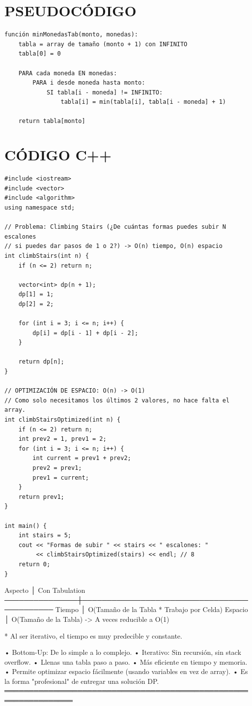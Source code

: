 \section*{PSEUDOCÓDIGO}
\hrulefill
\begin{verbatim}
función minMonedasTab(monto, monedas):
    tabla = array de tamaño (monto + 1) con INFINITO
    tabla[0] = 0

    PARA cada moneda EN monedas:
        PARA i desde moneda hasta monto:
            SI tabla[i - moneda] != INFINITO:
                tabla[i] = min(tabla[i], tabla[i - moneda] + 1)

    return tabla[monto]
\end{verbatim}
\section*{CÓDIGO C++}
\hrulefill
\begin{lstlisting}
#include <iostream>
#include <vector>
#include <algorithm>
using namespace std;

// Problema: Climbing Stairs (¿De cuántas formas puedes subir N escalones
// si puedes dar pasos de 1 o 2?) -> O(n) tiempo, O(n) espacio
int climbStairs(int n) {
    if (n <= 2) return n;
    
    vector<int> dp(n + 1);
    dp[1] = 1;
    dp[2] = 2;

    for (int i = 3; i <= n; i++) {
        dp[i] = dp[i - 1] + dp[i - 2];
    }

    return dp[n];
}

// OPTIMIZACIÓN DE ESPACIO: O(n) -> O(1)
// Como solo necesitamos los últimos 2 valores, no hace falta el array.
int climbStairsOptimized(int n) {
    if (n <= 2) return n;
    int prev2 = 1, prev1 = 2;
    for (int i = 3; i <= n; i++) {
        int current = prev1 + prev2;
        prev2 = prev1;
        prev1 = current;
    }
    return prev1;
}

int main() {
    int stairs = 5;
    cout << "Formas de subir " << stairs << " escalones: " 
         << climbStairsOptimized(stairs) << endl; // 8
    return 0;
}
\end{lstlisting}
\begin{dsacomplejidad}
Aspecto        │ Con Tabulation
  ───────────────┼────────────────────────────────────────────
  Tiempo         │ O(Tamaño de la Tabla * Trabajo por Celda)
  Espacio        │ O(Tamaño de la Tabla) -> A veces reducible a O(1)

* Al ser iterativo, el tiempo es muy predecible y constante.
\end{dsacomplejidad}
\begin{dsaentrevistas}

\end{dsaentrevistas}
\begin{dsaresumen}
• Bottom-Up: De lo simple a lo complejo.
• Iterativo: Sin recursión, sin stack overflow.
• Llenas una tabla paso a paso.
• Más eficiente en tiempo y memoria.
• Permite optimizar espacio fácilmente (usando variables en vez de array).
• Es la forma "profesional" de entregar una solución DP.
════════════════════════════════════════════════════════════════
\end{dsaresumen}

